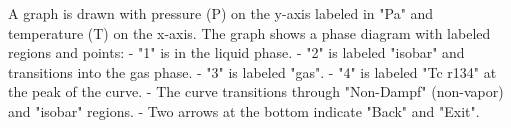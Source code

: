 A graph is drawn with pressure (P) on the y-axis labeled in "Pa" and temperature (T) on the x-axis. The graph shows a phase diagram with labeled regions and points:  
- "1" is in the liquid phase.  
- "2" is labeled "isobar" and transitions into the gas phase.  
- "3" is labeled "gas".  
- "4" is labeled "Tc r134" at the peak of the curve.  
- The curve transitions through "Non-Dampf" (non-vapor) and "isobar" regions.  
- Two arrows at the bottom indicate "Back" and "Exit".